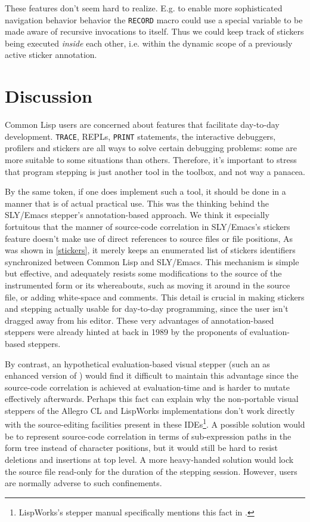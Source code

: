\documentclass[sigconf]{acmart}
\begin{document}
These features don't seem hard to realize.  E.g. to enable more
sophisticated navigation behavior behavior the \texttt{RECORD} macro
could use a special variable to be made aware of recursive invocations
to itself.  Thus we could keep track of stickers being executed
\emph{inside} each other, i.e. within the dynamic scope of a
previously active sticker annotation.

\section{Discussion}

Common Lisp users are concerned about features that facilitate
day-to-day development.  \texttt{TRACE}, REPLs, \texttt{PRINT}
statements, the interactive debuggers, profilers and stickers are all
ways to solve certain debugging problems: some are more suitable to
some situations than others.  Therefore, it's important to stress that
program stepping is just another tool in the toolbox, and not way a
panacea.

By the same token, if one does implement such a tool, it should be
done in a manner that is of actual practical use.  This was the
thinking behind the SLY/Emacs stepper's annotation-based approach.  We
think it especially fortuitous that the manner of source-code
correlation in SLY/Emacs's stickers feature doesn't make use of direct
references to source files or file positions, As was shown in
\ref{stickers}, it merely keeps an enumerated list of stickers
identifiers synchronized between Common Lisp and SLY/Emacs.  This
mechanism is simple but effective, and adequately resists some
modifications to the source of the instrumented form or its
whereabouts, such as moving it around in the source file, or adding
white-space and comments.  This detail is crucial in making stickers
and stepping actually usable for day-to-day programming, since the
user isn't dragged away from his editor.  These very advantages of
annotation-based steppers were already hinted at back in 1989 by the
proponents of evaluation-based steppers\cite[l.41,
l.42]{evaluation-based}.

By contrast, an hypothetical evaluation-based visual stepper (such an
as enhanced version of \cite{bourguignon}) would find it difficult to
maintain this advantage since the source-code correlation is achieved
at evaluation-time and is harder to mutate effectively afterwards.
Perhaps this fact can explain why the non-portable visual steppers of
the Allegro CL and LispWorks implementations don't work directly with
the source-editing facilities present in these
IDEs\footnote{LispWorks's stepper manual specifically mentions this
  fact in \cite{lispworks-stepper}.}.  A possible solution would be to
represent source-code correlation in terms of sub-expression paths in
the form tree instead of character positions, but it would still be
hard to resist deletions and insertions at top level.  A more
heavy-handed solution would lock the source file read-only for the
duration of the stepping session.  However, users are normally adverse
to such confinements.
\end{document}
